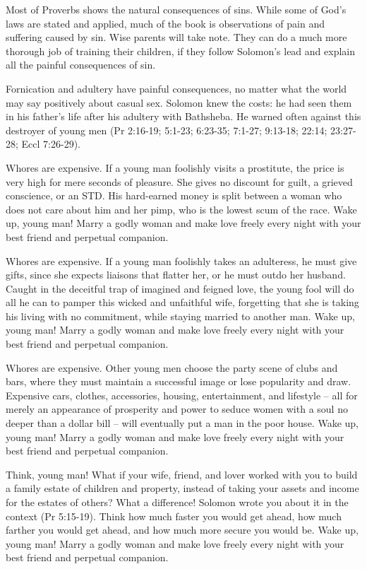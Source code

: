 Most of Proverbs shows the natural consequences of sins. While some of God’s laws are stated and applied, much of the book is observations of pain and suffering caused by sin. Wise parents will take note. They can do a much more thorough job of training their children, if they follow Solomon’s lead and explain all the painful consequences of sin.

Fornication and adultery have painful consequences, no matter what the world may say positively about casual sex. Solomon knew the costs: he had seen them in his father’s life after his adultery with Bathsheba. He warned often against this destroyer of young men (Pr 2:16-19; 5:1-23; 6:23-35; 7:1-27; 9:13-18; 22:14; 23:27-28; Eccl 7:26-29). 

Whores are expensive. If a young man foolishly visits a prostitute, the price is very high for mere seconds of pleasure. She gives no discount for guilt, a grieved conscience, or an STD. His hard-earned money is split between a woman who does not care about him and her pimp, who is the lowest scum of the race. Wake up, young man! Marry a godly woman and make love freely every night with your best friend and perpetual companion.

Whores are expensive. If a young man foolishly takes an adulteress, he must give gifts, since she expects liaisons that flatter her, or he must outdo her husband. Caught in the deceitful trap of imagined and feigned love, the young fool will do all he can to pamper this wicked and unfaithful wife, forgetting that she is taking his living with no commitment, while staying married to another man. Wake up, young man! Marry a godly woman and make love freely every night with your best friend and perpetual companion.

Whores are expensive. Other young men choose the party scene of clubs and bars, where they must maintain a successful image or lose popularity and draw. Expensive cars, clothes, accessories, housing, entertainment, and lifestyle – all for merely an appearance of prosperity and power to seduce women with a soul no deeper than a dollar bill – will eventually put a man in the poor house. Wake up, young man! Marry a godly woman and make love freely every night with your best friend and perpetual companion.

Think, young man! What if your wife, friend, and lover worked with you to build a family estate of children and property, instead of taking your assets and income for the estates of others? What a difference! Solomon wrote you about it in the context (Pr 5:15-19). Think how much faster you would get ahead, how much farther you would get ahead, and how much more secure you would be. Wake up, young man! Marry a godly woman and make love freely every night with your best friend and perpetual companion.

